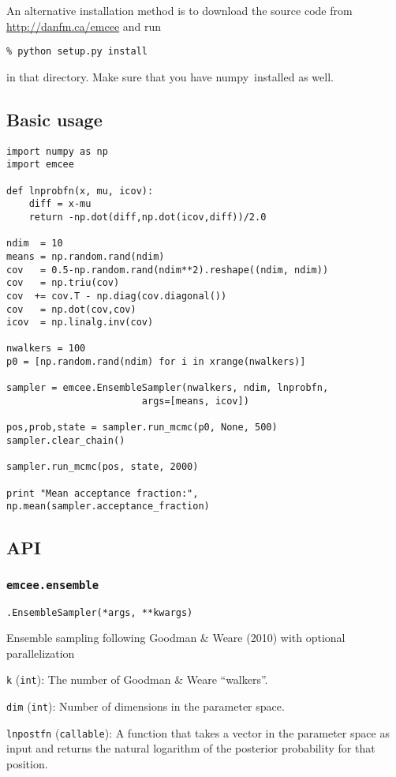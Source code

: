 \documentclass[12pt,preprint]{aastex}
\newcommand{\project}[1]{{\sffamily #1}}
\newcommand{\numpy}{\project{numpy}}
\newcommand{\thisplain}{emcee}
\newcommand{\this}{\project{\thisplain}}
\newlength{\argmarg}
\newcommand{\code}[1]{\texttt{#1}}
\newcommand{\class}[3]{\def\curclass{#1}
                \noindent{\scriptsize\this}\texttt{.}\code{#1{\small (#2)}}
                \begin{list}{}{\setlength{\leftmargin}{0.5\argmarg}}
                {\item #3}\end{list}}
\newcommand{\param}[3]{{\item {\code{#1}} {\footnotesize (\code{#2})}: #3}}
\newenvironment{arglist}[1]{\noindent\hspace{0.5\argmarg}{\bf {#1}}
    \begin{list}{}{
        \setlength{\leftmargin}{\argmarg}
    }}
    {\end{list}}
\newenvironment{args}{\begin{arglist}{Arguments}}{\end{arglist}}
\newcommand{\sectlabel}[1]{\label{sect:#1}}
\begin{document}
An alternative installation method is to download the source code from
\url{http://danfm.ca/emcee} and run
\begin{lstlisting}
% python setup.py install
\end{lstlisting}
in that directory. Make sure that you have \numpy~installed as well.

\subsection{Basic usage}
\begin{lstlisting}
import numpy as np
import emcee

def lnprobfn(x, mu, icov):
    diff = x-mu
    return -np.dot(diff,np.dot(icov,diff))/2.0

ndim  = 10
means = np.random.rand(ndim)
cov   = 0.5-np.random.rand(ndim**2).reshape((ndim, ndim))
cov   = np.triu(cov)
cov  += cov.T - np.diag(cov.diagonal())
cov   = np.dot(cov,cov)
icov  = np.linalg.inv(cov)

nwalkers = 100
p0 = [np.random.rand(ndim) for i in xrange(nwalkers)]

sampler = emcee.EnsembleSampler(nwalkers, ndim, lnprobfn,
                        args=[means, icov])

pos,prob,state = sampler.run_mcmc(p0, None, 500)
sampler.clear_chain()

sampler.run_mcmc(pos, state, 2000)

print "Mean acceptance fraction:", np.mean(sampler.acceptance_fraction)
\end{lstlisting}

\subsection{API} \sectlabel{api}

\subsubsection{\code{\thisplain.ensemble}}

\class{EnsembleSampler}{*args, **kwargs}
    {Ensemble sampling following Goodman \& Weare (2010) with optional
    parallelization}

\begin{args}
    \param{k}{int}{The number of Goodman \& Weare ``walkers''.}
    \param{dim}{int}{Number of dimensions in the parameter space.}
    \param{lnpostfn}{callable}{%
        A function that takes a vector in the parameter space as input and
        returns the natural logarithm of the posterior probability for that
        position.
    }
\end{args}
\end{document}
